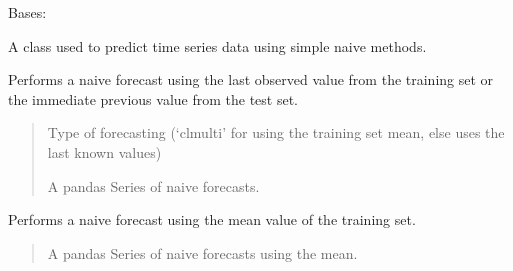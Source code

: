 \documentclass[letterpaper,10pt,english]{sphinxmanual}
\begin{document}
\begin{fulllineitems}
\label{\detokenize{docs/NAIVE_model:NAIVE_model.NAIVE_Predictor}}
\pysigstartsignatures
{}
\pysigstopsignatures
\sphinxAtStartPar
Bases: 

\sphinxAtStartPar
A class used to predict time series data using simple naive methods.

\begin{fulllineitems}
\label{\detokenize{docs/NAIVE_model:NAIVE_model.NAIVE_Predictor.forecast}}
\pysigstartsignatures
{}
\pysigstopsignatures
\sphinxAtStartPar
Performs a naive forecast using the last observed value from the training set or the immediate previous value from the test set.
\begin{quote}\begin{description}
\sphinxAtStartPar
{} \textendash{} Type of forecasting (‘cl\sphinxhyphen{}multi’ for using the training set mean, else uses the last known values)

\sphinxAtStartPar
A pandas Series of naive forecasts.

\end{description}\end{quote}

\end{fulllineitems}


\begin{fulllineitems}
\label{\detokenize{docs/NAIVE_model:NAIVE_model.NAIVE_Predictor.mean_forecast}}
\pysigstartsignatures
{}
\pysigstopsignatures
\sphinxAtStartPar
Performs a naive forecast using the mean value of the training set.
\begin{quote}\begin{description}
\sphinxAtStartPar
A pandas Series of naive forecasts using the mean.


\end{description}
\end{quote}
\end{fulllineitems}
\end{fulllineitems}
\end{document}
